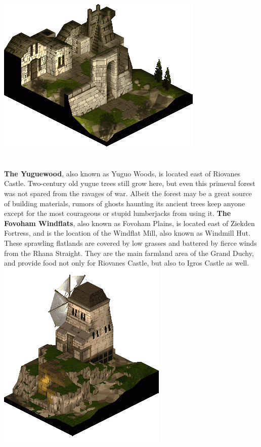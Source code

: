 \includegraphics[width=\columnwidth]{./art/images/yardrow.png}
\\\\\\
%
\textbf{The Yuguewood}, also known as Yuguo Woods, is located east of Riovanes Castle.
Two-century old yugue trees still grow here, but even this primeval forest was not spared from the ravages of war. 
Albeit the forest may be a great source of building materials, rumors of ghosts haunting its ancient trees keep anyone except for the most courageous or stupid lumberjacks from using it.
\textbf{The Fovoham Windflats}, also known as Fovoham Plains, is located east of Ziekden Fortress, and is the location of the Windflat Mill, also known as Windmill Hut. 
These sprawling flatlands are covered by low grasses and battered by fierce winds from the Rhana Straight. 
They are the main farmland area of the Grand Duchy, and provide food not only for Riovanes Castle, but also to Igros Castle as well.
%
\vfill
\includegraphics[width=\columnwidth]{./art/images/fovohamplains.png}
